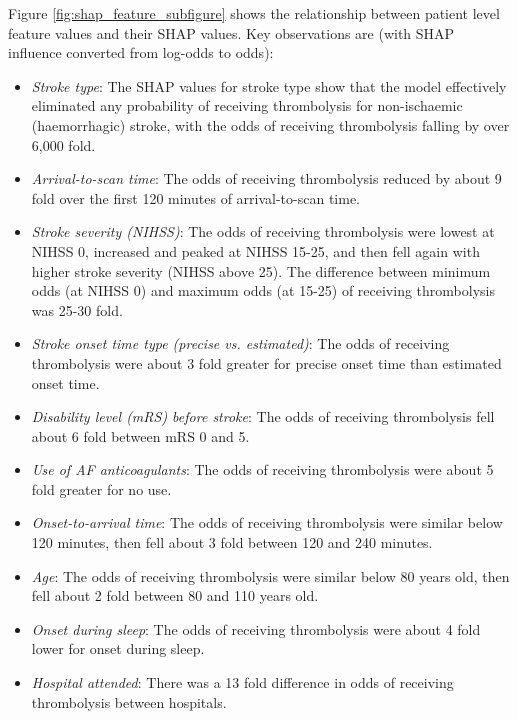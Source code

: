 \begin{minipage}{1\textwidth}
Figure \ref{fig:shap_feature_subfigure} shows the relationship between patient level feature values and their SHAP values. Key observations are (with SHAP influence converted from log-odds to odds):

\begin{itemize}
    \item \emph{Stroke type}: The SHAP values for stroke type show that the model effectively eliminated any probability of receiving thrombolysis for non-ischaemic (haemorrhagic) stroke, with the odds of receiving thrombolysis falling by over 6,000 fold.
    \item \emph{Arrival-to-scan time}: The odds of receiving thrombolysis reduced by about 9 fold over the first 120 minutes of arrival-to-scan time.
    \item \emph{Stroke severity (NIHSS)}: The odds of receiving thrombolysis were lowest at NIHSS 0, increased and peaked at NIHSS 15-25, and then fell again with higher stroke severity (NIHSS above 25). The difference between minimum odds (at NIHSS 0) and maximum odds (at 15-25) of receiving thrombolysis was 25-30 fold.
    \item \emph{Stroke onset time type (precise vs. estimated)}: The odds of receiving thrombolysis were about 3 fold greater for precise onset time than estimated onset time.
    \item \emph{Disability level (mRS) before stroke}: The odds of receiving thrombolysis fell about 6 fold between mRS 0 and 5.
    \item \emph{Use of AF anticoagulants}: The odds of receiving thrombolysis were about 5 fold greater for no use.
    \item \emph{Onset-to-arrival time}: The odds of receiving thrombolysis were similar below 120 minutes, then fell about 3 fold between 120 and 240 minutes.
    \item \emph{Age}: The odds of receiving thrombolysis were similar below 80 years old, then fell about 2 fold between 80 and 110 years old.    
    \item \emph{Onset during sleep}: The odds of receiving thrombolysis were about 4 fold lower for onset during sleep.
    \item \emph{Hospital attended}: There was a 13 fold difference in odds of receiving thrombolysis between hospitals.
\end{itemize}
\end{minipage}

